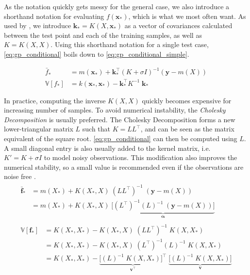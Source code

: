 As the notation quickly gets messy for the general case, we also introduce a shorthand notation for evaluating $f(\boldsymbol{x}_*)$, which is what we most often want. As used by \cite{rasmussen}, we introduce $\boldsymbol{k}_* = K(X, \boldsymbol{x}_*)$ as a vector of covariances calculated between the test point and each of the training samples, as well as $K=K(X, X)$. Using this shorthand notation for a single test case, \cref{eq:gp_conditional} boils down to \cref{eq:gp_conditional_simple}.

\begin{subequations}\label{eq:gp_conditional_simple}
\begin{align}
    \bar{f}_* &= m(\boldsymbol{x}_*) + \boldsymbol{k}_*^\intercal ( K + \sigma I)^{-1} (\boldsymbol{y} - m(X))\\
    \mathbb{V}[f_*] &= k(\boldsymbol{x}_*, \boldsymbol{x}_*) - \boldsymbol{k}_*^\intercal K^{-1} \; \boldsymbol{k}_*\label{eq:gp_conditional_var_simple}
\end{align}
\end{subequations}

In practice, computing the inverse $K(X, X)$ quickly becomes expensive for increasing number of samples. To avoid numerical instability, the \textit{Cholesky Decomposition} is usually preferred. The Cholesky Decomposition forms a new lower-triangular matrix $L$ such that $K = L L^\intercal$, and can be seen as the matrix equivalent of the square root. \cref{eq:gp_conditional} can then be computed using $L$. A small diagonal entry is also usually added to the kernel matrix, i.e. $K' = K + \sigma I$ to model noisy observations. This modification also improves the numerical stability, so a small value is recommended even if the observations are noise free \cite{scikit-learn}.
\begin{subequations}
\begin{align}
    \begin{split}
    \bar{\boldsymbol{f}}_* &= m(X_*) + K(X_*, X) \; (L L^\intercal)^{-1} \; (\boldsymbol{y} - m(X))\\ &= m(X_*) + K(X_*, X) \; \underbrace{\big[(L^\intercal)^{-1} (L)^{-1}  \; (\boldsymbol{y} - m(X))\big]}_{\boldsymbol{\alpha}}
    \end{split}\\
    \begin{split}
    \mathbb{V}[\boldsymbol{f}_*] &= K(X_*, X_*) - K(X_*, X) \; (L L^\intercal)^{-1} \; K(X, X_*)\\
    &= K(X_*, X_*) - K(X_*, X) \; (L^\intercal)^{-1} (L)^{-1} \; K(X, X_*)\\
    &= K(X_*, X_*) - \underbrace{\big[(L)^{-1} \; K(X, X_*)\big]^\intercal}_{\boldsymbol{v^\intercal}} \; \underbrace{\big[(L)^{-1} \; K(X, X_*)\big]}_{\boldsymbol{v}}
    \end{split}
\end{align}
\end{subequations}

